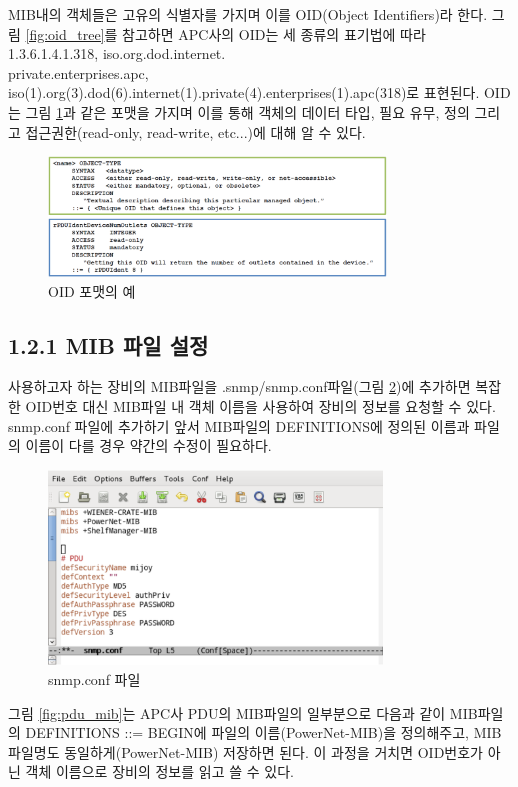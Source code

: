 \documentclass[11pt
  , a4paper
  , article
  , oneside
]{memoir}
\begin{document}
MIB내의 객체들은 고유의 식별자를 가지며 이를 OID(Object Identifiers)라 한다. 그림 \ref{fig:oid_tree}를 참고하면 APC사의 OID는 세 종류의 표기법에 따라 1.3.6.1.4.1.318, iso.org.dod.internet.\\private.enterprises.apc, iso(1).org(3).dod(6).internet(1).private(4).enterprises(1).apc(318)로 표현된다. OID는 그림 \ref{fig:ex_mib}과 같은 포맷을 가지며 이를 통해 객체의 데이터 타입, 필요 유무, 정의 그리고 접근권한(read-only, read-write, etc...)에 대해 알 수 있다. 

\begin{figure}[h!]
  \centering
  \includegraphics[width=0.8\textwidth]{./images/ex_mib.eps}
  \caption{OID 포맷의 예}
  \label{fig:ex_mib}   
\end{figure}


\subsection{1.2.1 MIB 파일 설정}
사용하고자 하는 장비의 MIB파일을 .snmp/snmp.conf파일(그림 \ref{fig:snmp_conf})에 추가하면 복잡한 OID번호 대신 MIB파일 내 객체 이름을 사용하여 장비의 정보를 요청할 수 있다.
snmp.conf 파일에 추가하기 앞서 MIB파일의 DEFINITIONS에 정의된 이름과 파일의 이름이 다를 경우 약간의 수정이 필요하다. 
\begin{figure}[h]
  \centering
  \includegraphics[width=0.79\textwidth]{./images/snmp_conf.eps}
  \caption{snmp.conf 파일}
  \label{fig:snmp_conf}   
\end{figure}

그림 \ref{fig:pdu_mib}는 APC사 PDU의 MIB파일의 일부분으로 다음과 같이 MIB파일의 DEFINITIONS ::= BEGIN에 파일의 이름(PowerNet-MIB)을 정의해주고, MIB파일명도 동일하게(PowerNet-MIB) 저장하면 된다. 이 과정을 거치면 OID번호가 아닌 객체 이름으로 장비의 정보를 읽고 쓸 수 있다. 
\end{document}
